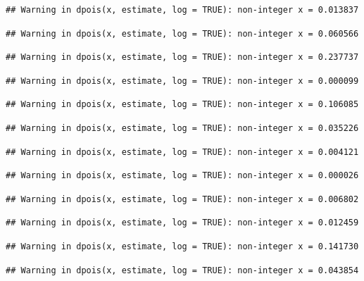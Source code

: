 \documentclass[]{article}
\begin{document}
\begin{verbatim}
## Warning in dpois(x, estimate, log = TRUE): non-integer x = 0.013837
\end{verbatim}

\begin{verbatim}
## Warning in dpois(x, estimate, log = TRUE): non-integer x = 0.060566
\end{verbatim}

\begin{verbatim}
## Warning in dpois(x, estimate, log = TRUE): non-integer x = 0.237737
\end{verbatim}

\begin{verbatim}
## Warning in dpois(x, estimate, log = TRUE): non-integer x = 0.000099
\end{verbatim}

\begin{verbatim}
## Warning in dpois(x, estimate, log = TRUE): non-integer x = 0.106085
\end{verbatim}

\begin{verbatim}
## Warning in dpois(x, estimate, log = TRUE): non-integer x = 0.035226
\end{verbatim}

\begin{verbatim}
## Warning in dpois(x, estimate, log = TRUE): non-integer x = 0.004121
\end{verbatim}

\begin{verbatim}
## Warning in dpois(x, estimate, log = TRUE): non-integer x = 0.000026
\end{verbatim}

\begin{verbatim}
## Warning in dpois(x, estimate, log = TRUE): non-integer x = 0.006802
\end{verbatim}

\begin{verbatim}
## Warning in dpois(x, estimate, log = TRUE): non-integer x = 0.012459
\end{verbatim}

\begin{verbatim}
## Warning in dpois(x, estimate, log = TRUE): non-integer x = 0.141730
\end{verbatim}

\begin{verbatim}
## Warning in dpois(x, estimate, log = TRUE): non-integer x = 0.043854
\end{verbatim}
\end{document}
